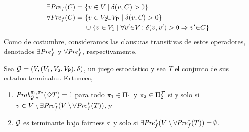 %
\begin{align*}
  \exists\mathit{Pre}_f(C) = {}&\{ v \in V \mid \delta(v,C) > 0\} \\
  \forall\mathit{Pre}_f(C) = {}&\{ v \in V_2{\cup} V_{\mathsf{P}} \mid \delta(v,C)>0\} \\ 
                       &\cup \{ v \in  V_1 \mid \forall v' {\in} V : \delta(v,v') > 0 \Rightarrow v' {\in} C \}
\end{align*}
Como de costumbre, consideramos las clausuras transitivas de estos operadores, denotados $\exists\mathit{Pre}_f^*$ y $\forall\mathit{Pre}_f^*$, respectivamente.
%
\begin{theorem}\label{thm:stopping-algorithm}
  Sea $\mathcal{G} = (V, (V_1, V_2, V_{\mathsf{P}}), \delta)$, un juego estocástico y sea $T$ el conjunto de sus estados terminales. Entonces,
  \begin{enumerate}[(1)]
  \item%
    $\mathit{Prob}^{\pi_{1}, \pi_{2}}_{\mathcal{G},v}(\Diamond T) = 1$ para todo
    $\pi_{1} \in \Pi_{1}$ y $\pi_{2} \in \Pi^{\mathcal{F}}_{2}$
    si y solo si $v \in V\setminus \exists\mathit{Pre}_f^*(V \setminus \forall\mathit{Pre}_f^*(T))$, y
  \item%
    $\mathcal{G}$ es terminante bajo fairness si y solo si
    $\exists\mathit{Pre}_f^*(V \setminus \forall\mathit{Pre}_f^*(T)) = \emptyset$.
  \end{enumerate}
\end{theorem}

